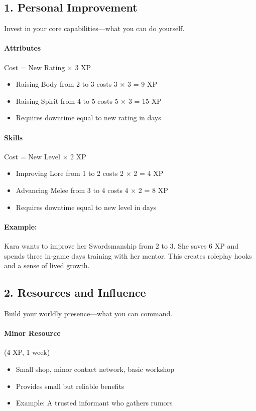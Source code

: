 \begin{multicols}{2}
\subsection*{1. Personal Improvement}

Invest in your core capabilities—what you can do yourself.

\paragraph{Attributes} Cost = New Rating × 3 XP 
\begin{itemize}
\item Raising Body from 2 to 3 costs 3 × 3 = 9 XP
\item Raising Spirit from 4 to 5 costs 5 × 3 = 15 XP
\item Requires downtime equal to new rating in days
\end{itemize}

\paragraph{Skills} Cost = New Level × 2 XP 
\begin{itemize}
\item Improving Lore from 1 to 2 costs 2 × 2 = 4 XP
\item Advancing Melee from 3 to 4 costs 4 × 2 = 8 XP
\item Requires downtime equal to new level in days
\end{itemize}

\paragraph{Example:}  
Kara wants to improve her Swordsmanship from 2 to 3. She saves 6 XP and spends three in-game days training with her mentor. This creates roleplay hooks and a sense of lived growth.

\subsection*{2. Resources and Influence}

Build your worldly presence—what you can command.

\paragraph{Minor Resource} (4 XP, 1 week)
\begin{itemize}
\item Small shop, minor contact network, basic workshop
\item Provides small but reliable benefits
\item Example: A trusted informant who gathers rumors
\end{itemize}


\end{multicols}
